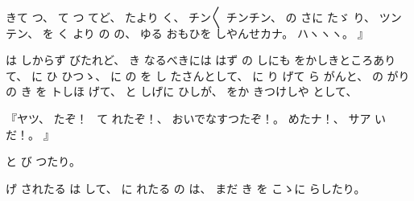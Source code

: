 %
きて
つ、
%
て
つ
てど、
%
たより
く、
%
チン〳〵
チンチン、
%
の
さに
たゞ
り、
%
ツンテン、
%
を
く
より
の
の、
%
ゆる
おもひを
しやんせカナ。
%
ハヽヽヽ。
』

%
は
しからず
びたれど、
%
き
なるべきには%
はず
の
しにも
をかしきところありて、
%
に
ひ
ひつゝ、
%
%
に
の
を
し
たさんとして、
%
に
り
げて
ら
がんと、
%
の
がりの
き
を
トしほ
げて、
%
と
しげに
ひしが、
%
をか
きつけしや
として、

%
『ヤツ、
%
たぞ！
\,%
て
れたぞ！、
%
おいでなすつたぞ！。
%
めたナ！、
%
サア
いだ！。
』

%
と
び
つたり。

%
げ
されたる
は
して、
%
に
れたる
の
は、
%
%
まだ
き
を
こゝに
らしたり。
